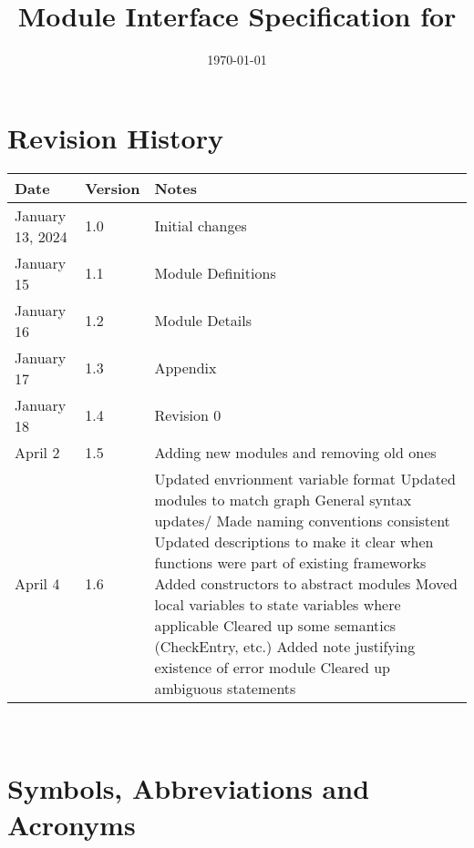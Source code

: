 \documentclass[12pt, titlepage]{article}
\begin{document}
\title{Module Interface Specification for \progname{}}

\author{\authname}

\date{\today}

\maketitle


\section{Revision History}

\begin{tabularx}{\textwidth}{p{3cm}p{2cm}X}
\toprule {\bf Date} & {\bf Version} & {\bf Notes}\\
\midrule
January 13, 2024 & 1.0 & Initial changes\\
January 15 & 1.1 & Module Definitions\\
January 16 & 1.2 & Module Details\\
January 17 & 1.3 & Appendix\\
January 18 & 1.4 & Revision 0\\
April 2 & 1.5 & Adding new modules and removing old ones\\
April 4 & 1.6 & Updated envrionment variable format
\newline Updated modules to match graph
\newline General syntax updates/ Made naming conventions consistent
\newline Updated descriptions to make it clear when functions were part of existing frameworks
\newline Added constructors to abstract modules
\newline Moved local variables to state variables where applicable
\newline Cleared up some semantics (CheckEntry, etc.)
\newline Added note justifying existence of error module
\newline Cleared up ambiguous statements\\
\bottomrule
\end{tabularx}

~\newpage

\section{Symbols, Abbreviations and Acronyms}
\end{document}
